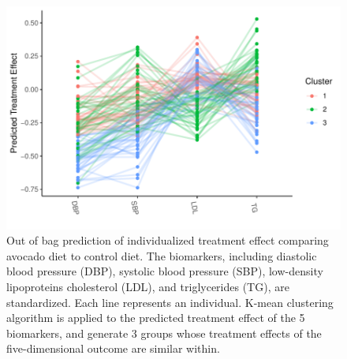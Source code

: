 \documentclass[smallextended]{svjour3}
\begin{document}


\begin{figure}[h]
    \centering
    \includegraphics[width = \textwidth]{Figures/Fig4_AvocadoTreatmentEffect_V3.pdf}
    \caption{ Out of bag prediction of individualized treatment effect comparing avocado diet to control diet. The biomarkers, including diastolic blood pressure (DBP), systolic blood pressure (SBP), low-density lipoproteins cholesterol (LDL), and triglycerides (TG), are standardized. Each line represents an individual. K-mean clustering algorithm is applied to the predicted treatment effect of the 5 biomarkers, and generate 3 groups whose treatment effects of the five-dimensional outcome are similar within.}\label{AvocadoPlot}
\end{figure}
\end{document}
